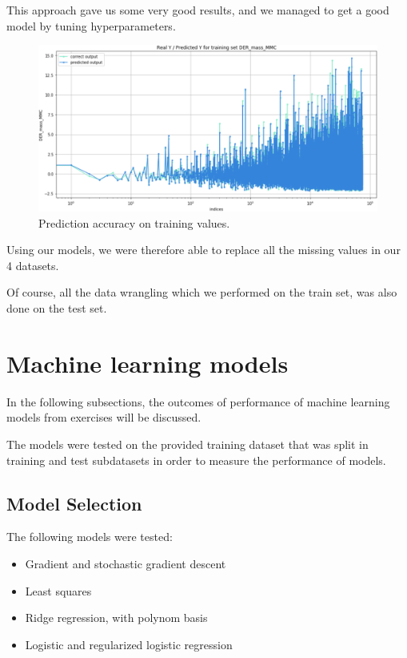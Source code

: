 \documentclass[10pt,conference,compsocconf]{IEEEtran}
\begin{document}
This approach gave us some very good results, and we managed to get a good model by tuning hyperparameters.

\begin{figure}[h]
  \centering
  \includegraphics[width=1\columnwidth]{cleaning_model}
  \caption{Prediction accuracy on training values.}
\end{figure}

Using our models, we were therefore able to replace all the missing values in our 4 datasets. 

Of course, all the data wrangling which we performed on the train set, was also done on the test set.

\section{\textbf{Machine learning models}}

In the following subsections, the outcomes of performance of machine learning models from exercises will be discussed.  

The models were tested on the provided training dataset that was split in training and test subdatasets in order to measure the performance of models.

\subsection{Model Selection}

The following models were tested:
\begin{itemize}
  \item Gradient and stochastic gradient descent
  \item Least squares
  \item Ridge regression, with polynom basis
  \item Logistic and regularized logistic regression
\end{itemize}\vspace*{10px}
\end{document}
